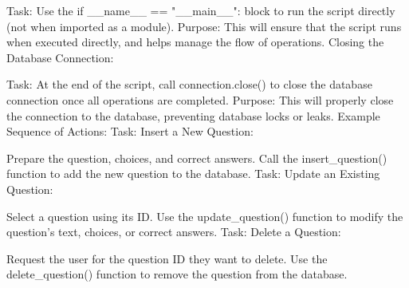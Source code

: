 Task: Use the if __name__ == "__main__": block to run the script directly (not when imported as a module).
Purpose: This will ensure that the script runs when executed directly, and helps manage the flow of operations.
Closing the Database Connection:

Task: At the end of the script, call connection.close() to close the database connection once all operations are completed.
Purpose: This will properly close the connection to the database, preventing database locks or leaks.
Example Sequence of Actions:
Task: Insert a New Question:

Prepare the question, choices, and correct answers.
Call the insert_question() function to add the new question to the database.
Task: Update an Existing Question:

Select a question using its ID.
Use the update_question() function to modify the question's text, choices, or correct answers.
Task: Delete a Question:

Request the user for the question ID they want to delete.
Use the delete_question() function to remove the question from the database.